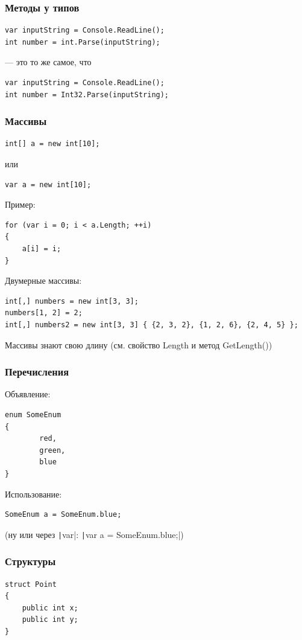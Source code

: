 \documentclass{../../slides-style}
\begin{document}
    \begin{frame}[fragile]
        \frametitle{Методы у типов}
        \begin{verbatim}
var inputString = Console.ReadLine();
int number = int.Parse(inputString);
        \end{verbatim}
        --- это то же самое, что
        \begin{verbatim}
var inputString = Console.ReadLine();
int number = Int32.Parse(inputString);
        \end{verbatim}
    \end{frame}

    \begin{frame}[fragile]
        \frametitle{Массивы}
        \begin{verbatim}
int[] a = new int[10];
        \end{verbatim}
        или
        \begin{verbatim}
var a = new int[10];
        \end{verbatim}
        Пример:
        \begin{verbatim}
for (var i = 0; i < a.Length; ++i)
{
    a[i] = i;
}
        \end{verbatim}
        Двумерные массивы:
        \begin{verbatim}
int[,] numbers = new int[3, 3];
numbers[1, 2] = 2; 
int[,] numbers2 = new int[3, 3] { {2, 3, 2}, {1, 2, 6}, {2, 4, 5} };
        \end{verbatim}
        Массивы знают свою длину (см. свойство Length и метод GetLength())
    \end{frame}

    \begin{frame}[fragile]
        \frametitle{Перечисления}
        Объявление:
        \begin{verbatim}
enum SomeEnum
{
        red,
        green,
        blue
}
        \end{verbatim}
        Использование:
        \begin{verbatim}
SomeEnum a = SomeEnum.blue;
        \end{verbatim}
        (ну или через \texttt|var|: \texttt|var a = SomeEnum.blue;|)
    \end{frame}

    \begin{frame}[fragile]
        \frametitle{Структуры}
        \begin{verbatim}
struct Point
{
    public int x;
    public int y;
}
        \end{verbatim}
    \end{frame}
\end{document}
